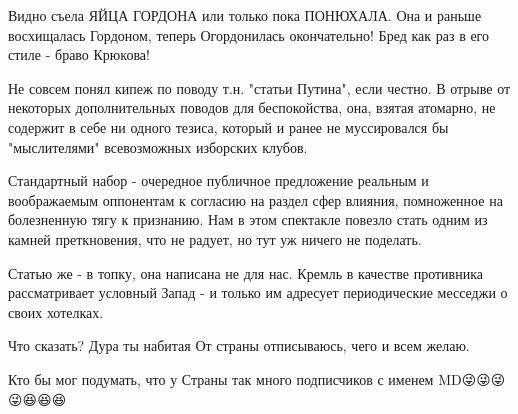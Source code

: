 \begin{itemize}
 
Видно съела ЯЙЦА ГОРДОНА или только пока ПОНЮХАЛА. Она и раньше восхищалась Гордоном, теперь Огордонилась окончательно! Бред как раз в его стиле - браво Крюкова!

 

Не совсем понял кипеж по поводу т.н. "статьи Путина", если честно. В отрыве от
некоторых дополнительных поводов для беспокойства, она, взятая атомарно, не
содержит в себе ни одного тезиса, который и ранее не муссировался бы
"мыслителями" всевозможных изборских клубов. 

Стандартный набор - очередное публичное предложение реальным и воображаемым
оппонентам к согласию на раздел сфер влияния, помноженное на болезненную тягу к
признанию. Нам в этом спектакле повезло стать одним из камней преткновения, что
не радует, но тут уж ничего не поделать. 

Статью же - в топку, она написана не для нас. Кремль в качестве противника
рассматривает условный Запад - и только им адресует периодические месседжи о
своих хотелках.

 
Что сказать?
Дура ты набитая
От страны отписываюсь, чего и всем желаю.

 
Кто бы мог подумать, что у Страны так много подписчиков с именем MD😜😜😜😜😆😆😆

 

\end{itemize}
